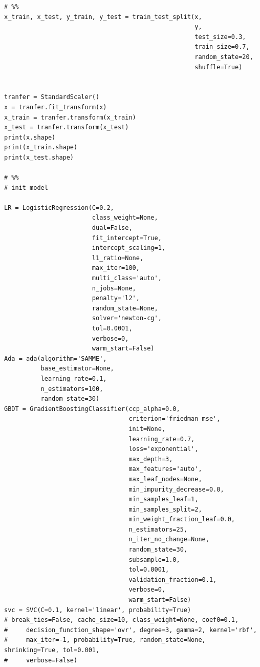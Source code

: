 \documentclass[UTF8]{ctexart}
\begin{document}
\begin{lstlisting}
# %%
x_train, x_test, y_train, y_test = train_test_split(x,
                                                    y,
                                                    test_size=0.3,
                                                    train_size=0.7,
                                                    random_state=20,
                                                    shuffle=True)


tranfer = StandardScaler()
x = tranfer.fit_transform(x)
x_train = tranfer.transform(x_train)
x_test = tranfer.transform(x_test)
print(x.shape)
print(x_train.shape)
print(x_test.shape)

# %%
# init model

LR = LogisticRegression(C=0.2,
                        class_weight=None,
                        dual=False,
                        fit_intercept=True,
                        intercept_scaling=1,
                        l1_ratio=None,
                        max_iter=100,
                        multi_class='auto',
                        n_jobs=None,
                        penalty='l2',
                        random_state=None,
                        solver='newton-cg',
                        tol=0.0001,
                        verbose=0,
                        warm_start=False)
Ada = ada(algorithm='SAMME',
          base_estimator=None,
          learning_rate=0.1,
          n_estimators=100,
          random_state=30)
GBDT = GradientBoostingClassifier(ccp_alpha=0.0,
                                  criterion='friedman_mse',
                                  init=None,
                                  learning_rate=0.7,
                                  loss='exponential',
                                  max_depth=3,
                                  max_features='auto',
                                  max_leaf_nodes=None,
                                  min_impurity_decrease=0.0,
                                  min_samples_leaf=1,
                                  min_samples_split=2,
                                  min_weight_fraction_leaf=0.0,
                                  n_estimators=25,
                                  n_iter_no_change=None,
                                  random_state=30,
                                  subsample=1.0,
                                  tol=0.0001,
                                  validation_fraction=0.1,
                                  verbose=0,
                                  warm_start=False)
svc = SVC(C=0.1, kernel='linear', probability=True)
# break_ties=False, cache_size=10, class_weight=None, coef0=0.1,
#     decision_function_shape='ovr', degree=3, gamma=2, kernel='rbf',
#     max_iter=-1, probability=True, random_state=None, shrinking=True, tol=0.001,
#     verbose=False)


\end{lstlisting}
\end{document}
